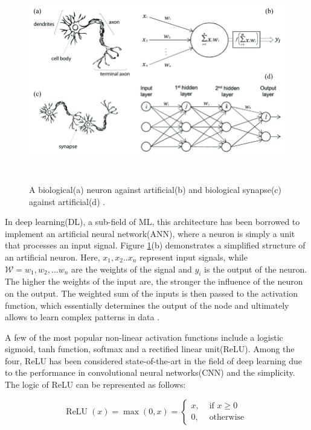 \documentclass[english, 12pt, a4paper, elec, utf8, a-1b, online]{aaltothesis}
\begin{document}
\begin{figure}[htb]
	\begin{center}
		\includegraphics[height=8cm]{./BioNeuronVsArtificial.png}
	\end{center}
	\caption{A biological(a) neuron against artificial(b) and biological synapse(c) against artificial(d) \cite{article1}.}
	\begin{center}
		\label{NeuronSchem}
	\end{center}
\end{figure}
\FloatBarrier

In deep learning(DL), a sub-field of ML, this architecture has been borrowed to implement an artificial neural network(ANN), where a neuron is simply a unit that processes an input signal. Figure \ref{NeuronSchem}(b) demonstrates a simplified structure of an artificial neuron. Here, $x_1, x_2..x_n$ represent input signals, while $\mathcal{W} = w_1, w_2, ... w_n$ are the weights of the signal and $y_i$ is the output of the neuron. The higher the weights of the input are, the stronger the influence of the neuron on the output. The weighted sum of the inputs is then passed to the activation function, which essentially determines the output of the node and ultimately allows to learn complex patterns in data \cite{Mehlig_2021}. 

A few of the most popular non-linear activation functions include a logistic sigmoid, tanh function, softmax and a rectified linear unit(ReLU). Among the four, ReLU has been considered state-of-the-art in the field of deep learning due to the performance in convolutional neural networks(CNN) \cite{Dubey2021} and the simplicity. The logic of ReLU can be represented as follows: 
  
\begin{equation}
	\operatorname{ReLU}(x)=\max (0, x)= \begin{cases}x, & \text { if } x \geq 0 \\ 0, & \text { otherwise }\end{cases}
\end{equation}
\end{document}
